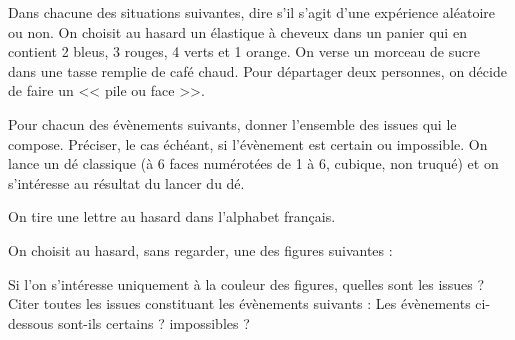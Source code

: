 \documentclass["../Cours.tex"]{subfiles}
\begin{document}

\EXERCICES
\begin{questions}
    \exercice Dans chacune des situations suivantes, dire s'il s'agit d'une expérience aléatoire ou non.
    \question On choisit au hasard un élastique à cheveux dans un panier qui en contient 2 bleus, 3 rouges, 4 verts et 1 orange.
    \question On verse un morceau de sucre dans une tasse remplie de café chaud.
    \question Pour départager deux personnes, on décide de faire un << pile ou face >>.
    
    \exercice Pour chacun des évènements suivants, donner l'ensemble des issues qui le compose. Préciser, le cas échéant, si l'évènement est certain ou impossible.
    \question On lance un dé classique (à 6 faces numérotées de 1 à 6, cubique, non truqué) et on s'intéresse au résultat du lancer du dé.

    \question On tire une lettre au hasard dans l'alphabet français.

    \exercice On choisit au hasard, sans regarder, une des figures suivantes :
    \begin{center}
    \end{center}

    \question Si l'on s'intéresse uniquement à la couleur des figures, quelles sont les issues ?
    \question Citer toutes les issues constituant les évènements suivants :
    \question Les évènements ci-dessous sont-ils certains ? impossibles ?


\end{questions}
\end{document}
